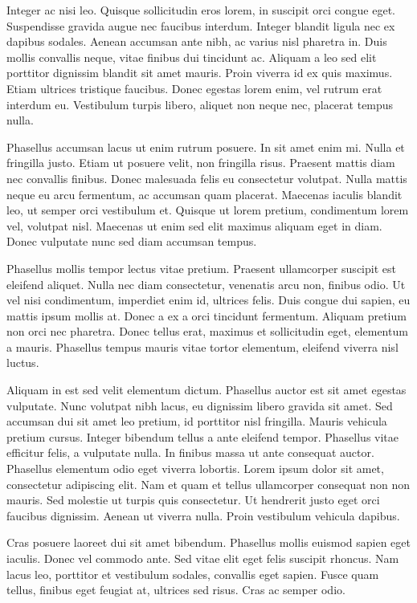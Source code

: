 Integer ac nisi leo. Quisque sollicitudin eros lorem, in suscipit orci congue
eget. Suspendisse gravida augue nec faucibus interdum. Integer blandit ligula
nec ex dapibus sodales. Aenean accumsan ante nibh, ac varius nisl pharetra in.
Duis mollis convallis neque, vitae finibus dui tincidunt ac. Aliquam a leo sed
elit porttitor dignissim blandit sit amet mauris. Proin viverra id ex quis
maximus. Etiam ultrices tristique faucibus. Donec egestas lorem enim, vel rutrum
erat interdum eu. Vestibulum turpis libero, aliquet non neque nec, placerat
tempus nulla.

Phasellus accumsan lacus ut enim rutrum posuere. In sit amet enim mi. Nulla et
fringilla justo. Etiam ut posuere velit, non fringilla risus. Praesent mattis
diam nec convallis finibus. Donec malesuada felis eu consectetur volutpat. Nulla
mattis neque eu arcu fermentum, ac accumsan quam placerat. Maecenas iaculis
blandit leo, ut semper orci vestibulum et. Quisque ut lorem pretium, condimentum
lorem vel, volutpat nisl. Maecenas ut enim sed elit maximus aliquam eget in
diam. Donec vulputate nunc sed diam accumsan tempus.

Phasellus mollis tempor lectus vitae pretium. Praesent ullamcorper suscipit est
eleifend aliquet. Nulla nec diam consectetur, venenatis arcu non, finibus odio.
Ut vel nisi condimentum, imperdiet enim id, ultrices felis. Duis congue dui
sapien, eu mattis ipsum mollis at. Donec a ex a orci tincidunt fermentum.
Aliquam pretium non orci nec pharetra. Donec tellus erat, maximus et
sollicitudin eget, elementum a mauris. Phasellus tempus mauris vitae tortor
elementum, eleifend viverra nisl luctus.

Aliquam in est sed velit elementum dictum. Phasellus auctor est sit amet egestas
vulputate. Nunc volutpat nibh lacus, eu dignissim libero gravida sit amet. Sed
accumsan dui sit amet leo pretium, id porttitor nisl fringilla. Mauris vehicula
pretium cursus. Integer bibendum tellus a ante eleifend tempor. Phasellus vitae
efficitur felis, a vulputate nulla. In finibus massa ut ante consequat auctor.
Phasellus elementum odio eget viverra lobortis. Lorem ipsum dolor sit amet,
consectetur adipiscing elit. Nam et quam et tellus ullamcorper consequat non non
mauris. Sed molestie ut turpis quis consectetur. Ut hendrerit justo eget orci
faucibus dignissim. Aenean ut viverra nulla. Proin vestibulum vehicula dapibus.

Cras posuere laoreet dui sit amet bibendum. Phasellus mollis euismod sapien eget
iaculis. Donec vel commodo ante. Sed vitae elit eget felis suscipit rhoncus. Nam
lacus leo, porttitor et vestibulum sodales, convallis eget sapien. Fusce quam
tellus, finibus eget feugiat at, ultrices sed risus. Cras ac semper odio.

